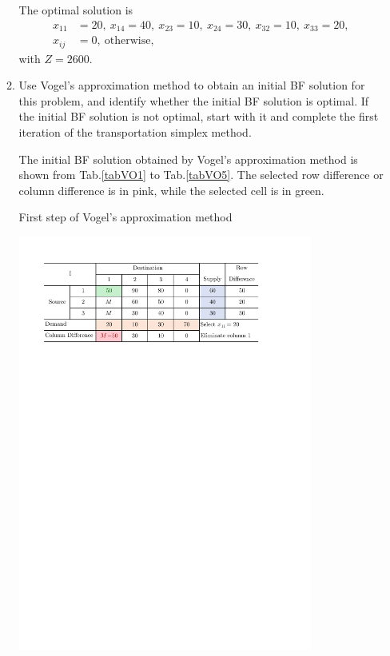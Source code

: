 \documentclass[a4paper]{article}
\begin{document}
\begin{enumerate}
\begin{enumerate}
\begin{solution}
		The optimal solution is 
		\begin{equation*}
		\begin{aligned}
		x_{11}&=20,\ x_{14}=40,\ x_{23}=10,\ x_{24}=30,\ x_{32}=10,\ x_{33}=20,\\
		x_{ij}&=0,\ \text{otherwise},
		\end{aligned}
		\end{equation*}
		with $Z=2600$.
		
	\end{solution}
	
	\item Use Vogel's approximation method to obtain an initial BF solution for this problem, and identify whether the initial BF solution is optimal. If the initial BF solution is not optimal, start with it and complete the first iteration of the transportation simplex method.
	\begin{solution}
		
		The initial BF solution obtained by Vogel's approximation method is shown from Tab.\ref{tabVO1} to Tab.\ref{tabVO5}. The selected row difference or column difference is in pink, while the selected cell is in green.
		\begin{table}[H]
			\caption{First step of Vogel's approximation method}
			\label{tabVO1}
			\centering
			\includegraphics[width = 0.8\textwidth]{VO1}				
		\end{table}
	

\end{solution}
\end{enumerate}
\end{enumerate}
\end{document}
